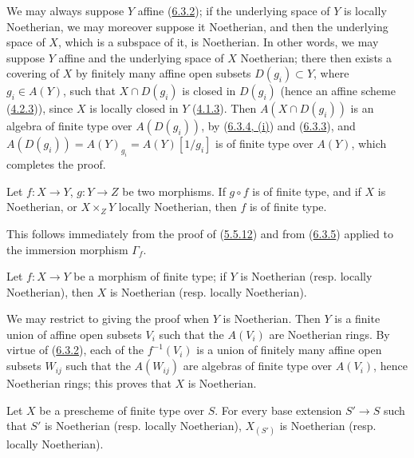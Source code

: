 We may always suppose $Y$ affine (\hyperref[I.6.3.2]{6.3.2}); if
the underlying space of $Y$ is locally Noetherian, we may moreover
suppose it Noetherian, and then the underlying space of $X$, which is a
subspace of it, is Noetherian. In other words, we may suppose $Y$ affine and
the underlying space of $X$ Noetherian; there then exists a covering of $X$
by finitely many affine open subsets $D(g_i)\subset Y$, where $g_i\in A(Y)$,
such that $X\cap D(g_i)$ is closed in $D(g_i)$ (hence an affine scheme
(\hyperref[I.4.2.3]{4.2.3})), since $X$ is locally closed in $Y$
(\hyperref[I.4.1.3]{4.1.3}). Then $A(X\cap D(g_i))$ is an algebra of
finite type over $A(D(g_i))$, by (\hyperref[I.6.3.4]{6.3.4, (i)}) and
(\hyperref[I.6.3.3]{6.3.3}), and
$A(D(g_i))=A(Y)_{g_i}=A(Y)[1/g_i]$ is of finite type over $A(Y)$, which
completes the proof.

\begin{corollary}[6.3.6]
\label{I.6.3.6}
Let $f:X\to Y$, $g:Y\to Z$ be two morphisms. If $g\circ f$ is of finite type,
and if $X$ is Noetherian, or $X\times_Z Y$ locally Noetherian, then $f$ is of
finite type.
\end{corollary}

This follows immediately from the proof of
(\hyperref[I.5.5.12]{5.5.12}) and from (\hyperref[I.6.3.5]{6.3.5})
applied to the immersion morphism $\Gamma_f$.

\begin{proposition}[6.3.7]
\label{I.6.3.7}
Let $f:X\to Y$ be a morphism of finite type; if $Y$ is Noetherian \textup{(resp.}
locally Noetherian), then $X$ is Noetherian \textup{(resp.} locally Noetherian).
\end{proposition}

We may restrict to giving the proof when $Y$ is Noetherian. Then $Y$
is a finite union of affine open subsets $V_i$ such that the $A(V_i)$ are
Noetherian rings. By virtue of (\hyperref[I.6.3.2]{6.3.2}), each of the
$f^{-1}(V_i)$ is a union of finitely many affine open subsets $W_{ij}$ such
that the $A(W_{ij})$ are algebras of finite type over $A(V_i)$, hence
Noetherian rings; this proves that $X$ is Noetherian.

\begin{corollary}[6.3.8]
\label{I.6.3.8}
Let $X$ be a prescheme of finite type over $S$. For every base extension
$S'\to S$ such that $S'$ is Noetherian \textup{(resp.} locally Noetherian),
$X_{(S')}$ is Noetherian \textup{(resp.} locally Noetherian).
\end{corollary}

